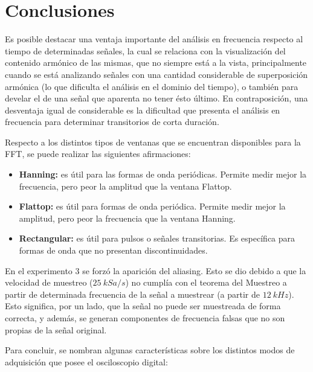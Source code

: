   \pagebreak
  \section{Conclusiones}

    Es posible destacar una ventaja importante del análisis en frecuencia respecto al tiempo de 
    determinadas señales, la cual se relaciona con la visualización del contenido armónico de las 
    mismas, que no siempre está a la vista, principalmente cuando se está analizando señales con 
    una cantidad considerable de superposición armónica (lo que dificulta el análisis en el dominio 
    del tiempo), o también para develar el de una señal que aparenta no tener ésto último. En 
    contraposición, una desventaja igual de considerable es la dificultad que presenta el análisis 
    en frecuencia para determinar transitorios de corta duración.

  Respecto a los distintos tipos de ventanas que se encuentran disponibles para la FFT, se puede realizar
  las siguientes afirmaciones:

  \begin{itemize}
    \item \textbf{Hanning:} es útil para las formas de onda periódicas. Permite medir mejor la frecuencia, pero peor
      la amplitud que la ventana Flattop.
    \item \textbf{Flattop:} es útil para formas de onda periódica. Permite medir mejor la amplitud, pero peor
      la frecuencia que la ventana Hanning.
    \item \textbf{Rectangular:} es útil para pulsos o señales transitorias. Es específica para formas de onda
      que no presentan discontinuidades.
  \end{itemize}

  En el experimento 3 se forzó la aparición del aliasing. Esto se dio debido a que la velocidad de muestreo ($25~kSa/s$)
  no cumplía con el teorema del Muestreo a partir de determinada frecuencia de la señal a muestrear (a partir de $12~kHz$).
  Esto significa, por un lado, que la señal no puede ser muestreada de forma correcta, y además, se generan componentes
  de frecuencia falsas que no son propias de la señal original.

  Para concluir, se nombran algunas características sobre los distintos modos de adquisición que posee el osciloscopio
  digital:

